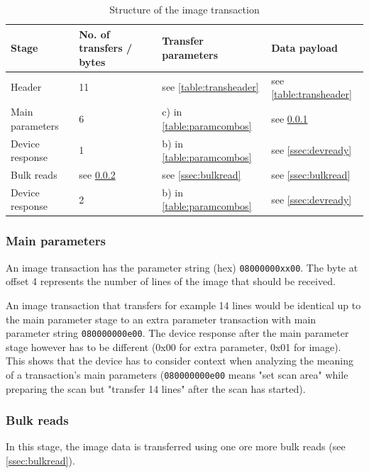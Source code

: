 \documentclass{article}
\begin{document}
\begin{table}[H]
  \caption{Structure of the image transaction}
  \centering
  \begin{tabular}{p{3cm} | p{1.5cm} | p{3cm} | p{3cm}}
    Stage & No. of transfers / bytes & Transfer parameters & Data payload \\ \hline
    
    Header & 11 & see \autoref{table:transheader} & see \autoref{table:transheader} \\
    Main parameters & 6 & c) in \autoref{table:paramcombos} & see \ref{ssec:image_param} \\
    Device response & 1 & b) in \autoref{table:paramcombos} & see \ref{ssec:devready} \\
    Bulk reads & see \ref{ssec:image_bulk} & see \ref{ssec:bulkread} & see \ref{ssec:bulkread} \\
    Device response & 2 & b) in \autoref{table:paramcombos} & see \ref{ssec:devready} \\
  \end{tabular}
\end{table}

\subsubsection{Main parameters}
\label{ssec:image_param}

An image transaction has the parameter string (hex) {\tt 08000000xx00}.
The byte at offset 4 represents the number of lines of the image that
should be received.

An image transaction that transfers for example 14 lines would be identical
up to the main parameter stage
to an extra parameter transaction with main parameter string {\tt 080000000e00}.
The device response after the main parameter stage however has to be different
(0x00 for extra parameter, 0x01 for image). This shows that the device has
to consider context when analyzing the meaning of a transaction's main parameters
({\tt 080000000e00} means "set scan area" while preparing the scan but
"transfer 14 lines" after the scan has started).

\subsubsection{Bulk reads}
\label{ssec:image_bulk}

In this stage, the image data is transferred using one ore more
bulk reads (see \ref{ssec:bulkread}).
\end{document}
